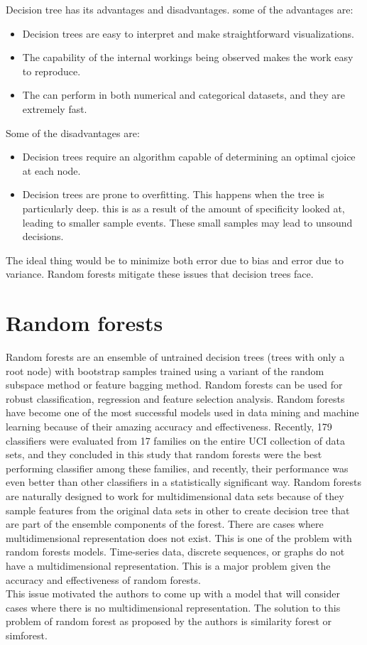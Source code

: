 \documentclass{article}
\begin{document}
Decision tree has its advantages and disadvantages. some of the advantages are: 
\begin{itemize}
\item Decision trees are easy to interpret and make straightforward visualizations.
\item  The capability of the internal workings being observed makes the work easy to reproduce.
\item The can perform in both numerical and categorical datasets, and they are extremely fast.

\end{itemize}
Some of the disadvantages are:
\begin{itemize}
\item Decision trees require an algorithm capable of determining an optimal cjoice at each node. 
\item Decision trees are prone to overfitting. This happens when the tree is particularly deep. this is as a result of the amount of specificity looked at, leading to smaller sample events. These small samples may lead to unsound decisions.
\end{itemize}
 The ideal thing would be to minimize both error due to bias and error due to variance. Random forests mitigate these issues that decision trees face.


\section{Random forests}
Random forests are an ensemble of untrained decision trees (trees with only a root node) with bootstrap samples trained using a variant of the random subspace method or feature bagging method. Random forests can be used for robust classification, regression and feature selection analysis.
\noindent Random forests have become one of the most successful models used in data mining and machine learning because of their amazing accuracy and effectiveness. Recently, 179 classifiers were evaluated from 17 families on the entire UCI collection of data sets, and they concluded in this study that random forests were the best performing classifier among these families, and recently, their performance was even better than other classifiers in a statistically significant way. Random forests are naturally designed to work for multidimensional data sets because of they sample features from the original data sets in other to create decision tree that are part of the ensemble components of the forest. There are cases where multidimensional representation does not exist. This is one of the problem with random forests models. Time-series data, discrete sequences, or graphs do not have a multidimensional representation. This is a major problem given the accuracy and effectiveness of random forests.\\
This issue motivated the authors to come up with a model that will consider cases where there is no multidimensional representation. The solution to this problem of random forest as proposed by the authors is similarity forest or simforest.
\end{document}
